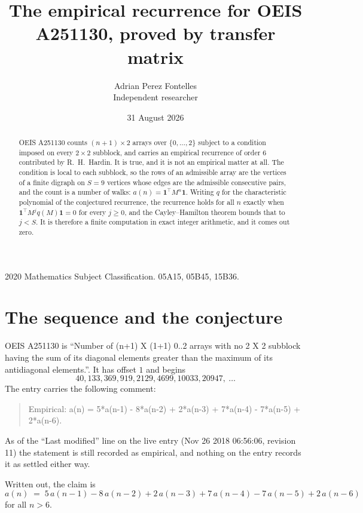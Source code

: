 \documentclass[11pt,a4paper]{article}
\title{The empirical recurrence for OEIS A251130, proved by transfer matrix}
\author{Adrian Perez Fontelles\\ \small Independent researcher}
\date{31 August 2026}
\theoremstyle{plain}
\theoremstyle{definition}
\begin{document}
\maketitle

\begin{abstract}
OEIS A251130 counts $(n+1)\times2$ arrays over $\{0,\dots,2\}$ subject to a condition imposed on
every $2\times2$ subblock, and carries an empirical recurrence of order $6$ contributed
by R.~H.~Hardin. It is true, and it is not an empirical matter at all. The condition is local
to each subblock, so the rows of an admissible array are the vertices of a finite digraph
on $S=9$ vertices whose edges are the admissible consecutive pairs, and the count is a
number of walks: $a(n)=\mathbf{1}^{\!\top}M^{n}\mathbf{1}$. Writing $q$
for the characteristic polynomial of the conjectured recurrence, the recurrence holds for all
$n$ exactly when $\mathbf{1}^{\!\top}M^{j}q(M)\mathbf{1}=0$ for every $j\ge0$, and the
Cayley--Hamilton theorem bounds that to $j<S$. It is therefore a finite computation in exact
integer arithmetic, and it comes out zero.
\end{abstract}

\noindent\small 2020 Mathematics Subject Classification. 05A15, 05B45, 15B36.\normalsize

\section{The sequence and the conjecture}

OEIS A251130 is ``Number of (n+1) X (1+1) 0..2 arrays with no 2 X 2 subblock having the sum of its diagonal elements greater than the maximum of its antidiagonal elements.''. It has offset $1$ and begins
\[
40, 133, 369, 919, 2129, 4699, 10033, 20947,\ \dots
\]
The entry carries the following comment:
\begin{quote}\small
Empirical: a(n) = 5*a(n-1) - 8*a(n-2) + 2*a(n-3) + 7*a(n-4) - 7*a(n-5) + 2*a(n-6).
\end{quote}
As of the ``Last modified'' line on the live entry (Nov 26 2018 06:56:06, revision 11) the statement is
still recorded as empirical, and nothing on the entry records it as settled either way.

Written out, the claim is
\begin{equation}\label{eq:conj}
a(n)\;=\;5\,a(n-1) - 8\,a(n-2) + 2\,a(n-3) + 7\,a(n-4) - 7\,a(n-5) + 2\,a(n-6)
\end{equation}
for all $n>6$.
\end{document}
